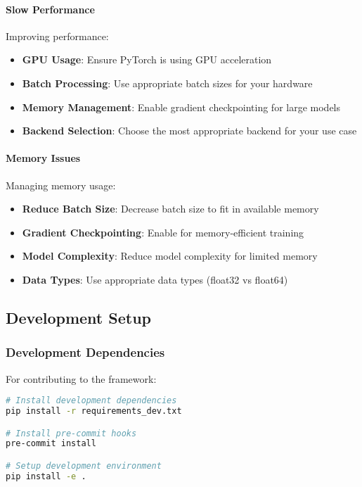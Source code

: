 \paragraph{Slow Performance}
Improving performance:
\begin{itemize}
    \item \textbf{GPU Usage}: Ensure PyTorch is using GPU acceleration
    \item \textbf{Batch Processing}: Use appropriate batch sizes for your hardware
    \item \textbf{Memory Management}: Enable gradient checkpointing for large models
    \item \textbf{Backend Selection}: Choose the most appropriate backend for your use case
\end{itemize}

\paragraph{Memory Issues}
Managing memory usage:
\begin{itemize}
    \item \textbf{Reduce Batch Size}: Decrease batch size to fit in available memory
    \item \textbf{Gradient Checkpointing}: Enable for memory-efficient training
    \item \textbf{Model Complexity}: Reduce model complexity for limited memory
    \item \textbf{Data Types}: Use appropriate data types (float32 vs float64)
\end{itemize}

\subsection{Development Setup}

\subsubsection{Development Dependencies}
For contributing to the framework:

\begin{lstlisting}[language=bash, caption=Development Setup]
# Install development dependencies
pip install -r requirements_dev.txt

# Install pre-commit hooks
pre-commit install

# Setup development environment
pip install -e .
\end{lstlisting}


